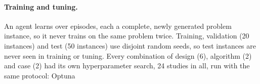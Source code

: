 \documentclass[12pt]{article}
\providecommand{\DIFaddtex}[1]{{\color{red}#1}} %
\providecommand{\DIFdeltex}[1]{} %
\providecommand{\DIFaddbegin}{} %
\providecommand{\DIFaddend}{} %
\providecommand{\DIFdelbegin}{} %
\providecommand{\DIFdelend}{} %
\providecommand{\DIFadd}[1]{\texorpdfstring{\DIFaddtex{#1}}{#1}} %
\providecommand{\DIFdel}[1]{\texorpdfstring{\DIFdeltex{#1}}{}} %
\providecommand{\DIFscaledelfig}{0.5}
\newlength{\DIFdelgraphicswidth} %
\newlength{\DIFdelgraphicsheight} %
\providecommand{\DIFaddincludegraphics}[2][]{{\color{blue}\fbox{\DIFOincludegraphics[#1]{#2}}}} %
\providecommand{\DIFdelincludegraphics}[2][]{%
\sbox{\DIFdelgraphicsbox}{\DIFOincludegraphics[#1]{#2}}%
\settoboxwidth{\DIFdelgraphicswidth}{\DIFdelgraphicsbox} %
\settoboxtotalheight{\DIFdelgraphicsheight}{\DIFdelgraphicsbox} %
\scalebox{\DIFscaledelfig}{%
\parbox[b]{\DIFdelgraphicswidth}{\usebox{\DIFdelgraphicsbox}\\[-\baselineskip] \rule{\DIFdelgraphicswidth}{0em}}\llap{\resizebox{\DIFdelgraphicswidth}{\DIFdelgraphicsheight}{%
\setlength{\unitlength}{\DIFdelgraphicswidth}%
\begin{picture}(1,1)%
\thicklines\linethickness{2pt} %
{\color[rgb]{1,0,0}\put(0,0){\framebox(1,1){}}}%
{\color[rgb]{1,0,0}\put(0,0){\line( 1,1){1}}}%
{\color[rgb]{1,0,0}\put(0,1){\line(1,-1){1}}}%
\end{picture}%
}\hspace*{3pt}}} %
} %
\DeclareRobustCommand{\DIFaddbegin}{\DIFOaddbegin \let\includegraphics\DIFaddincludegraphics} %
\DeclareRobustCommand{\DIFaddend}{\DIFOaddend \let\includegraphics\DIFOincludegraphics} %
\DeclareRobustCommand{\DIFdelbegin}{\DIFOdelbegin \let\includegraphics\DIFdelincludegraphics} %
\DeclareRobustCommand{\DIFdelend}{\DIFOaddend \let\includegraphics\DIFOincludegraphics} %
\begin{document}
\DIFdelbegin \paragraph{\DIFdel{Training}}%
\addtocounter{paragraph}{-1}%
\DIFdel{. }\DIFdelend \DIFaddbegin \paragraph{\DIFadd{Training and tuning.}} \DIFaddend An agent learns \DIFdelbegin \DIFdel{by interacting with an environment over a sequence of episodes. One episode is one complete problem instance, i.e an instance of making decisions until the horizon $H$ is reached for some given environment. Every episode uses a newly generated random instanceof job parameters so that the agent never sees }\DIFdelend \DIFaddbegin \DIFadd{over episodes, each a complete, newly generated problem instance, so it never trains on }\DIFaddend the same problem twice\DIFdelbegin \DIFdel{and can thereby generalise. Every RL action design was trained with PPO and A2C, }\DIFdelend \DIFaddbegin \DIFadd{. Training, validation (20 instances) and test (50 instances) use disjoint random seeds, so test instances are never seen in training or tuning. Every combination of design (6), algorithm (2) and case (2) had its own hyperparameter search, 24 studies in all, run }\DIFaddend with the same \DIFdelbegin \DIFdel{tuning and training budgets. Hyperparameters were tuned with Optuna \mbox{%
\cite{akiba2019optuna} }\hskip0pt%
using }\DIFdelend \DIFaddbegin \DIFadd{protocol: Optuna \mbox{%
\cite{akiba2019optuna} }\hskip0pt%
}
\end{document}

